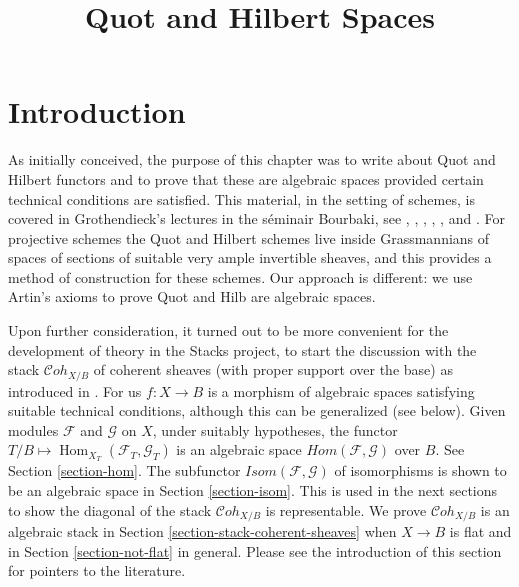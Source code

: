 \documentclass{stacks-project}
\theoremstyle{plain}
\theoremstyle{definition}
\theoremstyle{remark}
\numberwithin{equation}{subsection}
\def\Hom{\mathop{\mathrm{Hom}}\nolimits}
\def\Cohstack{\mathcal{C}\!\mathit{oh}}
\begin{document}
\title{Quot and Hilbert Spaces}

\maketitle

\label{section-phantom}

\tableofcontents




\section{Introduction}
\label{section-introduction}

\noindent
As initially conceived, the purpose of this chapter was to write about
Quot and Hilbert functors and to prove that these are algebraic spaces
provided certain technical conditions are satisfied. This material, in
the setting of schemes, is
covered in Grothendieck's lectures in the s\'eminair Bourbaki, see
\cite{Gr-I},
\cite{Gr-II},
\cite{Gr-III},
\cite{Gr-IV},
\cite{Gr-V}, and
\cite{Gr-VI}. For projective schemes the Quot and Hilbert schemes
live inside Grassmannians of spaces of sections of suitable very
ample invertible sheaves, and this provides a method of construction
for these schemes. Our approach is different: we use Artin's axioms to
prove Quot and Hilb are algebraic spaces.

\medskip\noindent
Upon further consideration, it turned out to be more convenient for
the development of theory in the Stacks project, to start the
discussion with the stack $\Cohstack_{X/B}$
of coherent sheaves (with proper support over the base)
as introduced in \cite{lieblich_remarks}. For us $f : X \to B$
is a morphism of algebraic spaces satisfying suitable
technical conditions, although this can be generalized (see below).
Given modules $\mathcal{F}$ and $\mathcal{G}$
on $X$, under suitably hypotheses, the functor
$T/B \mapsto \Hom_{X_T}(\mathcal{F}_T, \mathcal{G}_T)$
is an algebraic space $\mathit{Hom}(\mathcal{F}, \mathcal{G})$
over $B$. See Section \ref{section-hom}. The subfunctor
$\mathit{Isom}(\mathcal{F}, \mathcal{G})$ of isomorphisms is
shown to be an algebraic space in Section \ref{section-isom}.
This is used in the next sections to show the diagonal of
the stack $\Cohstack_{X/B}$ is representable. We prove
$\Cohstack_{X/B}$ is an algebraic stack in
Section \ref{section-stack-coherent-sheaves} when $X \to B$ is flat
and in Section \ref{section-not-flat} in general.
Please see the introduction of this section for pointers
to the literature.
\end{document}
